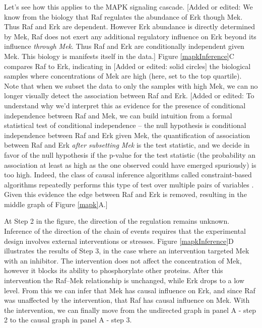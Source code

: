 \documentclass[journal=jacsat,manuscript=article]{achemso}
\def\added#1{{\color{magenta}[Added or edited: #1]}}
\begin{document}
Let's see how this applies to the MAPK signaling cascade. \added{We know from the biology that Raf regulates the abundance of Erk though Mek.  Thus Raf and Erk are dependent.  However Erk abundance is directly determined by Mek, Raf does not exert any additional regulatory influence on Erk beyond its influence {\it through Mek}.  Thus Raf and Erk are conditionally independent given Mek.  This biology is manifests itself in the data.}  Figure \ref{mapkInference}C compares Raf to Erk, indicating in \added{solid circles} the biological samples where concentrations of Mek are high (here, set to the top quartile).   Note that when we subset the data to only the samples with high Mek, we can no longer visually detect the association between Raf and Erk.  \added{To understand why we'd interpret this as evidence for the presence of conditional independence between Raf and Mek, we can build intuition from a formal statistical test of conditional independence -- the null hypothesis is conditional independence between Raf and Erk given Mek, the quantification of association between Raf and Erk {\it after subsetting Mek} is the test statistic, and we decide in favor of the null hypothesis if the p-value for the test statistic (the probability an association at least as high as the one observed could have emerged spuriously) is too high.  Indeed, the class of causal inference algorithms called constraint-based algorithms repeatedly performs this type of test over multiple pairs of variables \cite{spirtes2000causation}. Given this evidence the edge between Raf and Erk is removed, resulting in the middle graph of Figure \ref{mapk}A.}  

At Step 2 in the figure, the direction of the regulation remains unknown. Inference of the direction of the chain of events requires that the experimental design involves external interventions or stresses. Figure \ref{mapkInference}D illustrates the results of Step 3, in the case where an intervention targeted Mek with an inhibitor. The intervention does not affect the concentration of Mek, however it blocks its ability to phosphorylate other proteins.  After this intervention the Raf--Mek relationship is unchanged, while Erk drops to a low level.  From this we can infer that Mek has causal influence on Erk, and since Raf was unaffected by the intervention, that Raf has causal influence on Mek.  With the intervention, we can finally move from the undirected graph in panel A - step 2 to the causal graph in panel A - step 3.
\end{document}
